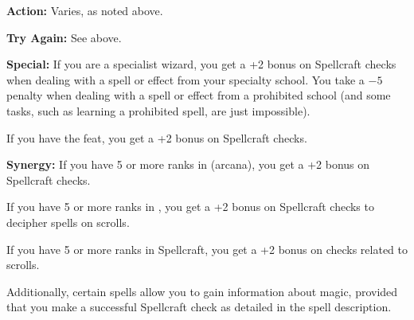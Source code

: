 \textbf{Action:} Varies, as noted above.

\textbf{Try Again:} See above.

\textbf{Special:} If you are a specialist wizard, you get a +2 bonus on Spellcraft checks when dealing with a spell or effect from your specialty school. You take a $-5$ penalty when dealing with a spell or effect from a prohibited school (and some tasks, such as learning a prohibited spell, are just impossible).

If you have the  feat, you get a +2 bonus on Spellcraft checks.

\textbf{Synergy:} If you have 5 or more ranks in  (arcana), you get a +2 bonus on Spellcraft checks.

If you have 5 or more ranks in , you get a +2 bonus on Spellcraft checks to decipher spells on scrolls.

If you have 5 or more ranks in Spellcraft, you get a +2 bonus on  checks related to scrolls.

Additionally, certain spells allow you to gain information about magic, provided that you make a successful Spellcraft check as detailed in the spell description.